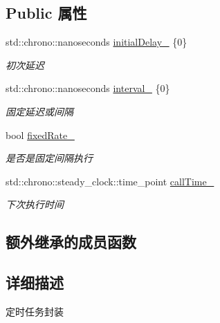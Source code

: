 \subsection*{Public 属性}
\begin{DoxyCompactItemize}
\item 
\mbox{\label{structTimerTask_af49a805f814a0b92e1f96037226a2d2e}} 
std\+::chrono\+::nanoseconds \hyperlink{structTimerTask_af49a805f814a0b92e1f96037226a2d2e}{initial\+Delay\+\_\+} \{0\}
\begin{DoxyCompactList}\small\item\em 初次延迟 \end{DoxyCompactList}\item 
\mbox{\label{structTimerTask_afd954f592d96d8abe152e0f54b30979e}} 
std\+::chrono\+::nanoseconds \hyperlink{structTimerTask_afd954f592d96d8abe152e0f54b30979e}{interval\+\_\+} \{0\}
\begin{DoxyCompactList}\small\item\em 固定延迟或间隔 \end{DoxyCompactList}\item 
\mbox{\label{structTimerTask_a31da300c15d00f58c2950e9752027e42}} 
bool \hyperlink{structTimerTask_a31da300c15d00f58c2950e9752027e42}{fixed\+Rate\+\_\+}
\begin{DoxyCompactList}\small\item\em 是否是固定间隔执行 \end{DoxyCompactList}\item 
\mbox{\label{structTimerTask_a7bcf4dfd5b91038d4c4c5378285d4ed0}} 
std\+::chrono\+::steady\+\_\+clock\+::time\+\_\+point \hyperlink{structTimerTask_a7bcf4dfd5b91038d4c4c5378285d4ed0}{call\+Time\+\_\+}
\begin{DoxyCompactList}\small\item\em 下次执行时间 \end{DoxyCompactList}\end{DoxyCompactItemize}
\subsection*{额外继承的成员函数}


\subsection{详细描述}
定时任务封装 

